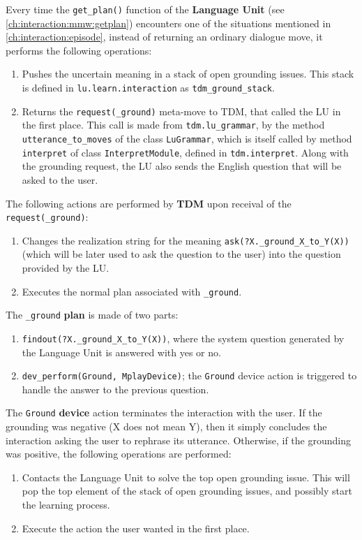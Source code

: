 Every time the \texttt{get\_plan()} function of the \textbf{Language Unit} (see \ref{ch:interaction:mmw:getplan}) encounters one of the situations mentioned in \ref{ch:interaction:episode}, instead of returning an ordinary dialogue move, it performs the following operations: 
\begin{enumerate}
	\item Pushes the uncertain meaning in a stack of open grounding issues. This stack is defined in \texttt{lu.learn.interaction} as \texttt{tdm\_ground\_stack}.
	\item Returns the \texttt{request(\_ground)} meta-move to TDM, that called the LU in the first place. This call is made from \texttt{tdm.lu\_grammar}, by the method \texttt{utterance\_to\_moves} of the class \texttt{LuGrammar}, which is itself called by method \texttt{interpret} of class \texttt{InterpretModule}, defined in \texttt{tdm.interpret}. Along with the grounding request, the LU also sends the English question that will be asked to the user.
\end{enumerate}

The following actions are performed by \textbf{TDM} upon receival of the \texttt{request(\_ground)}:
\begin{enumerate}
	\item Changes the realization string for the meaning \texttt{ask(?X.\_ground\_X\_to\_Y(X))} (which will be later used to ask the question to the user)  into the question provided by the LU.
	\item Executes the normal plan associated with  \texttt{\_ground}.
\end{enumerate}

The \texttt{\_ground} \textbf{plan} is made of two parts:
\begin{enumerate}
	\item \texttt{findout(?X.\_ground\_X\_to\_Y(X))}, where the system question generated by the Language Unit is answered with yes or no.
	\item \texttt{dev\_perform(Ground, MplayDevice)}; the \texttt{Ground} device action is triggered to handle the answer to the previous question.
\end{enumerate}

The \texttt{Ground} \textbf{device} action terminates the interaction with the user. If the grounding was negative (X does not mean Y), then it simply concludes the interaction asking the user to rephrase its utterance. Otherwise, if the grounding was positive, the following operations are performed:
\begin{enumerate}
	\item Contacts the Language Unit to solve the top open grounding issue. This will pop the top element of the stack of open grounding issues, and possibly start the learning process.
	\item Execute the action the user wanted in the first place.
\end{enumerate}


